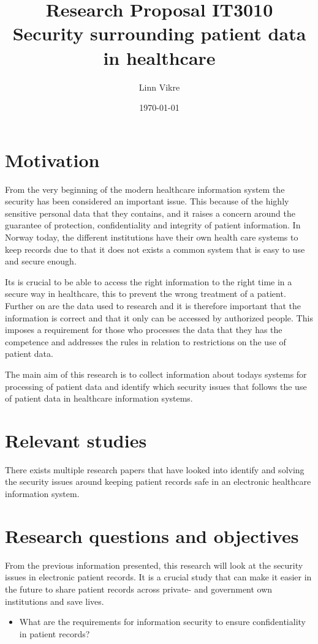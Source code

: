 \documentclass[11pt, a4paper]{article}
\title{Research Proposal IT3010\\ Security surrounding patient data in healthcare}
\author{Linn Vikre}
\date{\today}
\begin{document}
\maketitle
\section{Motivation}
From the very beginning of the modern healthcare information system the security has been considered an important issue. This because of the highly sensitive personal data that they contains, and it raises a concern around the guarantee of protection, confidentiality and integrity of patient information\cite{Smith199939}. In Norway today, the different institutions have their own health care systems to keep records due to that it does not exists a common system that is easy to use and secure enough.

Its is crucial to be able to access the right information to the right time in a secure way in healthcare, this to prevent the wrong treatment of a patient. Further on are the data used to research and it is therefore important that the information is correct and that it only can be accessed by authorized people. This imposes a requirement for those who processes the data that they has the competence and addresses the rules in relation to restrictions on the use of patient data\cite{faxvaag2007er}. 

The main aim of this research is to collect information about todays systems for processing of patient data and identify which security issues that follows the use of patient data in healthcare information systems.

\section{Relevant studies}

There exists multiple research papers that have looked into identify and solving the security issues around keeping patient records safe in an electronic healthcare information system. 

\section{Research questions and objectives}

From the previous information presented, this research will look at the security issues in electronic patient records. It is a crucial study that can make it easier in the future to share patient records across private- and government own institutions and save lives. 

\begin{itemize}
\item What are the requirements for information security to ensure confidentiality in patient records?
\end{itemize}


\end{document}
